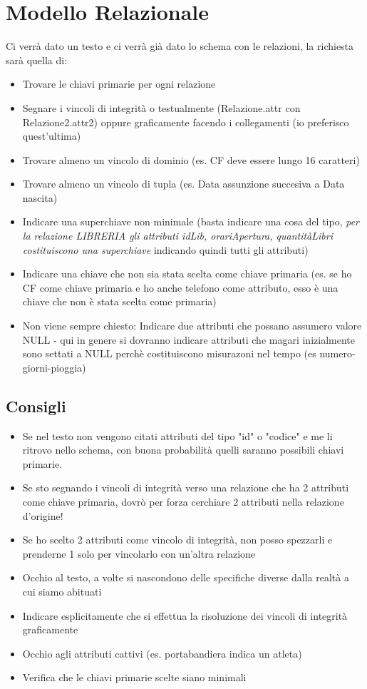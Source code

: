 \section{Modello Relazionale}
Ci verrà dato un testo e ci verrà già dato lo schema con le relazioni, la richiesta
sarà quella di:
\begin{itemize}
    \item Trovare le chiavi primarie per ogni relazione
    \item Segnare i vincoli di integrità o testualmente (Relazione.attr con Relazione2.attr2)
    oppure graficamente facendo i collegamenti (io preferisco quest'ultima)
    \item Trovare almeno un vincolo di dominio (es. CF deve essere lungo 16 caratteri)
    \item Trovare almeno un vincolo di tupla (es. Data assunzione succesiva a Data nascita)
    \item Indicare una superchiave non minimale (basta indicare una cosa del tipo,
    \textit{per la relazione LIBRERIA gli attributi idLib, orariApertura, quantitàLibri costituiscono una 
    superchiave} indicando quindi tutti gli attributi)
    \item Indicare una chiave che non sia stata scelta come chiave primaria (es. se ho CF come chiave
    primaria e ho anche telefono come attributo, esso è una chiave che non è stata scelta come primaria)
    \item Non viene sempre chiesto: Indicare due attributi che possano assumero valore
     NULL - qui in genere si dovranno indicare attributi che magari inizialmente sono
      settati a NULL perchè costituiscono misurazoni nel tempo 
      (es numero-giorni-pioggia)
\end{itemize}

\subsection*{Consigli}
\begin{itemize}
    \item Se nel testo non vengono citati attributi del tipo "id" o "codice" e me li ritrovo
    nello schema, con buona probabilità quelli saranno possibili chiavi primarie.
    \item Se sto segnando i vincoli di integrità verso una relazione che ha 2 attributi
    come chiave primaria, dovrò per forza cerchiare 2 attributi nella relazione d'origine!
    \item Se ho scelto 2 attributi come vincolo di integrità, non posso spezzarli e prenderne 1 solo
    per vincolarlo con un'altra relazione
    \item Occhio al testo, a volte si nascondono delle specifiche diverse dalla realtà
    a cui siamo abituati
    \item Indicare esplicitamente che si effettua la risoluzione dei vincoli di integrità
    graficamente 
    \item Occhio agli attributi cattivi (es. portabandiera indica un atleta)
    \item Verifica che le chiavi primarie scelte siano minimali
\end{itemize}
